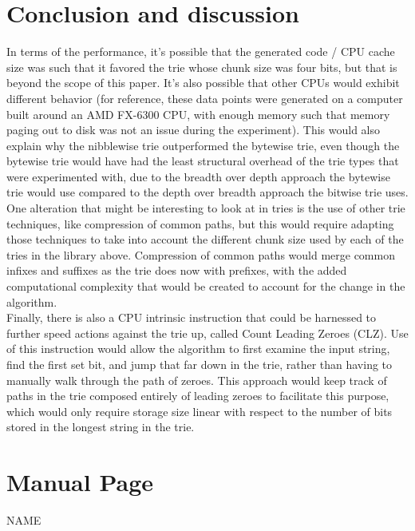 \documentclass{llncs}
\begin{document}
\section{Conclusion and discussion}
In terms of the performance, it's possible that the generated code / CPU cache size was such that it favored the trie whose chunk size was four bits, but that is beyond the scope of this paper. It's also possible that other CPUs would exhibit different behavior (for reference, these data points were generated on a computer built around an AMD FX-6300 CPU, with enough memory such that memory paging out to disk was not an issue during the experiment). This would also explain why the nibblewise trie outperformed the bytewise trie, even though the bytewise trie would have had the least structural overhead of the trie types that were experimented with, due to the breadth over depth approach the bytewise trie would use compared to the depth over breadth approach the bitwise trie uses.\\
One alteration that might be interesting to look at in tries is the use of other trie techniques, like compression of common paths, but this would require adapting those techniques to take into account the different chunk size used by each of the tries in the library above. Compression of common paths would merge common infixes and suffixes as the trie does now with prefixes, with the added computational complexity that would be created to account for the change in the algorithm.\\
Finally, there is also a CPU intrinsic instruction that could be harnessed to further speed actions against the trie up, called Count Leading Zeroes (CLZ). Use of this instruction would allow the algorithm to first examine the input string, find the first set bit, and jump that far down in the trie, rather than having to manually walk through the path of zeroes. This approach would keep track of paths in the trie composed entirely of leading zeroes to facilitate this purpose, which would only require storage size linear with respect to the number of bits stored in the longest string in the trie. \\
\newpage
\section{Manual Page}
\noindent NAME
\end{document}
